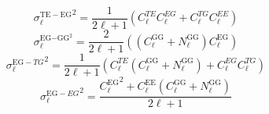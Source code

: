   \begin{equation}
    {\sigma_{\ell}^{\mathrm{TE} - \mathrm{EG}}}^2 = \frac{1}{2 \ell + 1}
    (C_{\ell}^{{TE}} C_{\ell}^{{EG}} + C_{\ell}^{{TG}}
    C_{\ell}^{{EE}})
  \end{equation}
  \begin{equation}
    \sigma_{\ell}^{\textrm{EG$\textrm{$-$GG}$}^2} = \frac{2}{2 \ell + 1} 
    ((C_{\ell}^{\mathrm{GG}} + N_{\ell}^{\mathrm{GG}}) C_{\ell}^{\mathrm{EG}})
  \end{equation}
  \begin{equation}
    {\sigma_{\ell}^{\mathrm{EG} - {TG}}}^2 = \frac{1}{2 \ell + 1}
    (C_{\ell}^{{TE}} (C_{\ell}^{\mathrm{GG}} + N_{\ell}^{\mathrm{GG}}) +
    C_{\ell}^{{EG}} C_{\ell}^{{TG}})
  \end{equation}
  \begin{equation}
    {\sigma_{\ell}^{\mathrm{EG} - {EG}}}^2 =
    \frac{{C_{\ell}^{\mathrm{EG}}}^2 + C_{\ell}^{\mathrm{EE}} 
    (C_{\ell}^{\mathrm{GG}} + N_{\ell}^{\mathrm{GG}})}{2 \ell + 1}
  \end{equation}